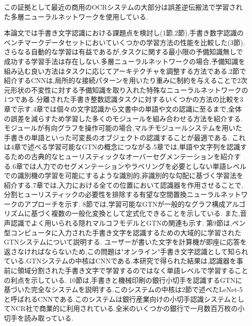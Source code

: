 \documentclass[twocolumn]{jarticle}     %
\begin{document}
この証拠として最近の商用のOCRシステムの大部分は誤差逆伝搬法で学習された多層ニューラルネットワークを使用している.\par
本論文では手書き文字認識における課題点を検討し(1節,2節),手書き数字認識のベンチマークデータセットにおいていくつかの学習方法の性能を比較した(3節).さらなる自動的な学習は有益であるが,タスクに関する最小限の予備知識無しで成功する学習手法は存在しない.多層ニューラルネットワークの場合,予備知識を組み込む良い方法はタスクに応じてアーキテクチャを調整する方法である.2節で紹介するCNN\cite{2}は,局所的な接続パターンを用いたり重みに制約を与えることで2次元形状の不変性に対する予備知識を取り入れた特殊なニューラルネットワークの1つである.分離された手書き整数認識タスクに対するいくつかの方法の比較を3章で示す.4章では個々の文字認識から文書中の単語や文の認識に至るまで,全体の誤差を減らすため学習した多くのモジュールを組み合わせる方法を紹介する.モジュールが有向グラフを操作可能の場合,マルチモジュールシステムを用いた手書きの単語といった可変長のオブジェクトの認識することが最適である.
これは4章で述べる学習可能なGTNの概念につながる.5章では,単語や文字列を認識するための古典的なヒューリスティックなオーバーセグメンテーションを紹介する.6章では人力でのセグメンテーションやラベリングを必要としない単語レベルでの識別機の学習を可能にするような識別的,非識別的な勾配に基づく学習法を紹介する.7章では,入力における全ての位置において認識器を作用させることで,分割ヒューリスティックの必要性を排除する有望な空間置換ニューラルネットワークのアプローチを示す.
8節では,学習可能なGTNが一般的なグラフ構成アルゴリズムに基づく複数の一般化変換として定式化できることを示している.
また,音声認識でよく用いられる隠れマルコフモデルとGTNの関連も示す.
第9節は,ペン型コンピュータに入力された手書き文字を認識するための大域的に学習されたGTNシステムについて説明する.
ユーザーが書いた文字を計算機が即座に応答を返さなければならないため,この問題は"オンライン"手書き文字認識として知られている.GTNシステムの中核はCNNである.本研究で得られた結果は,認識器を事前に領域分割された手書き文字で学習するのではなく単語レベルで学習することの利点を示している.
10節は,手書きと機械印刷の銀行小切手を認識するGTNに基づいた完全なシステムを説明する.このシステムの中核は2節で述べたLeNet-5と呼ばれるCNNである.このシステムは銀行産業向けの小切手認識システムとしてNCR社で商業的に利用されている.全米のいくつかの銀行で一月数百万枚の小切手を読み取っている.
\end{document}
